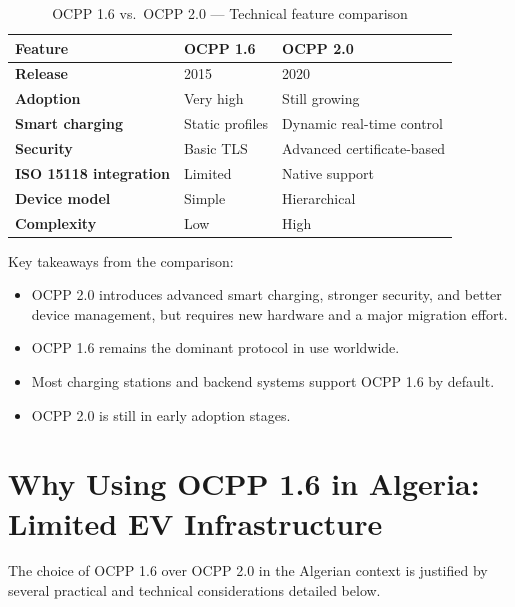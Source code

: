 \documentclass[12pt,a4paper]{report}
\begin{document}
\begin{table}[h!]
  \centering
  \caption{OCPP 1.6 vs.\ OCPP 2.0 --- Technical feature comparison}
  \label{tab:ocpp-comparison}
  \renewcommand{\arraystretch}{1.35}
  \begin{tabular}{>{\bfseries}p{5cm} p{4.5cm} p{4.5cm}}
    \toprule
    Feature                  & OCPP 1.6                  & OCPP 2.0 \\
    \midrule
    Release                  & 2015                      & 2020 \\
    Adoption                 & Very high                 & Still growing \\
    Smart charging           & Static profiles           & Dynamic real-time control \\
    Security                 & Basic TLS                 & Advanced certificate-based \\
    ISO 15118 integration    & Limited                   & Native support \\
    Device model             & Simple                    & Hierarchical \\
    Complexity               & Low                       & High \\
    \bottomrule
  \end{tabular}
\end{table}

Key takeaways from the comparison:
\begin{itemize}
  \item OCPP 2.0 introduces advanced smart charging, stronger security, and better device
        management, but requires new hardware and a major migration effort.
  \item OCPP 1.6 remains the dominant protocol in use worldwide.
  \item Most charging stations and backend systems support OCPP 1.6 by default.
  \item OCPP 2.0 is still in early adoption stages.
\end{itemize}

\section{Why Using OCPP 1.6 in Algeria: Limited EV Infrastructure}

The choice of OCPP 1.6 over OCPP 2.0 in the Algerian context is justified by several
practical and technical considerations detailed below.
\end{document}
